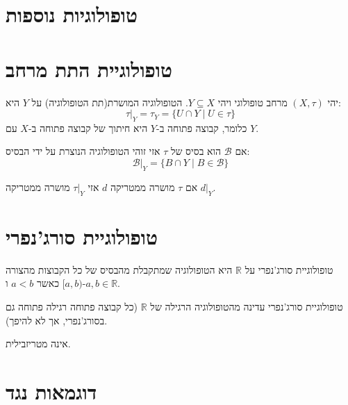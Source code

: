 \documentclass{tstextbook}
\begin{document}
\section{טופולוגיות נוספות}

\section{טופולוגיית התת מרחב}

\begin{definition}
יהי \(\left( X,\tau \right)\) מרחב טופולוגי ויהי \(Y\subseteq X\). הטופולוגיה המושרת(תת הטופולוגיה) על \(Y\) היא:
$$\tau|_Y = \tau_Y = \{ U \cap Y \mid U \in \tau \}$$
כלומר, קבוצה פתוחה ב-\(Y\) היא חיתוך של קבוצה פתוחה ב-\(X\) עם \(Y\).

\end{definition}
\begin{proposition}
אם \(\mathcal{B}\) הוא בסיס של \(\tau\) אזי זוהי הטופולוגיה הנוצרת על ידי הבסיס:
$$\mathcal{B}|_{Y}=\{ B\cap Y\mid B \in \mathcal{B} \}$$

\end{proposition}
\begin{proposition}
אם \(\tau\) מושרה ממטריקה \(d\) אזי \(\tau|_{Y}\) מושרה ממטריקה \(d|_{Y}\).

\end{proposition}
\section{טופולוגיית סורג'נפרי}

\begin{definition}
טופולוגיית סורג'נפרי על \(\mathbb{R}\) היא הטופולוגיה שמתקבלת מהבסיס של כל הקבוצות מהצורה \([a, b)\) כאשר \(a < b\) ו-\(a, b \in \mathbb{R}\).

\end{definition}
\begin{proposition}
טופולוגיית סורג'נפרי עדינה מהטופולוגיה הרגילה של \(\mathbb{R}\) (כל קבוצה פתוחה רגילה פתוחה גם בסורג'נפרי, אך לא להיפך).

\end{proposition}
\begin{proposition}
אינה מטריזבילית.

\end{proposition}
\section{דוגמאות נגד}
\end{document}
